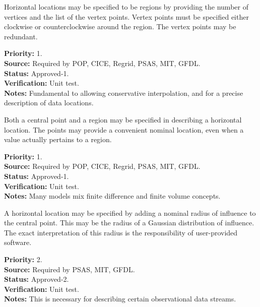 
  Horizontal locations may be specified to be regions by providing the number
of vertices and the list of the vertex points.  Vertex points must be specified
either clockwise or counterclockwise around the region.  The vertex points
may be redundant.
\begin{reqlist}
{\bf Priority:} 1. \\
{\bf Source:} Required by POP, CICE, Regrid, PSAS, MIT, GFDL. \\
{\bf Status:} Approved-1. \\
{\bf Verification:} Unit test.\\
{\bf Notes:} Fundamental to allowing conservative interpolation, and for a
precise description of data locations.
\end{reqlist}
 

  Both a central point and a region may be specified in describing a horizontal
location.  The points may provide a convenient nominal location, even when
a value actually pertains to a region.
\begin{reqlist}
{\bf Priority:} 1. \\
{\bf Source:} Required by POP, CICE, Regrid, PSAS, MIT, GFDL. \\
{\bf Status:} Approved-1. \\
{\bf Verification:} Unit test.\\
{\bf Notes:} Many models mix finite difference and finite volume concepts.
\end{reqlist}


  A horizontal location may be specified by adding a nominal radius of
influence to the central point.  This may be the radius of a Gaussian
distribution of influence. The exact interpretation of this radius is
the responsibility of user-provided software.
\begin{reqlist}
{\bf Priority:} 2. \\
{\bf Source:} Required by PSAS, MIT, GFDL. \\
{\bf Status:} Approved-2. \\
{\bf Verification:} Unit test.\\
{\bf Notes:} This is necessary for describing certain observational data streams.
\end{reqlist}


